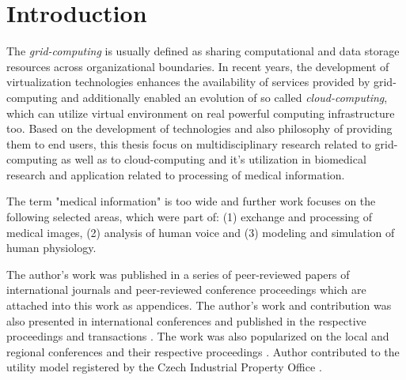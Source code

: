\section{Introduction}

The \emph{grid-computing} is usually defined as sharing computational and data storage resources across organizational boundaries. In recent years, the development of virtualization technologies enhances the availability of services provided by grid-computing and additionally enabled an evolution of so called \emph{cloud-computing}, which can utilize virtual environment on real powerful computing infrastructure too. Based on the development of technologies and also philosophy of providing them to end users, this thesis focus on multidisciplinary research related to grid-computing as well as to cloud-computing and it's utilization in biomedical research and application related to processing of medical information.

The term "medical information" is too wide and further work focuses on the following selected areas, which were part of:
(1) exchange and processing of medical images, (2) analysis of human voice and (3) modeling and simulation of human physiology. %

The author's work was published in a series of peer-reviewed papers of international journals and peer-reviewed conference proceedings \cite{kulhanek2009, kulhanek2010b, kulhanek2010c,  
Kulhanek2014Parameters, Kulhanek2014Modeling, Kulhanek2014mefanet, Matejak2014sj} which are attached into this work as appendices.
The author's work and contribution was also presented in international conferences and published in the respective proceedings and transactions
\cite{Kulhanek2010, Kulhanek2013c, kofranek2013hummod, Matejak2014}. The work was also popularized on the local and regional conferences and their respective proceedings \cite{Kulhanek2008Mefanet, Sarek2009, kulhanek2009dd, Kulhanek2009Mefanet, Kulhanek2010d, Kulhanek2010Mefanet, Kulhanek2011, kulhanek2011dd, Kulhanek2012, Kulhanek2013b, Kulhanek2014, Kulhanek2012a}. Author contributed to the utility model registered by the Czech Industrial Property Office \cite{Kofranek2014a}.

